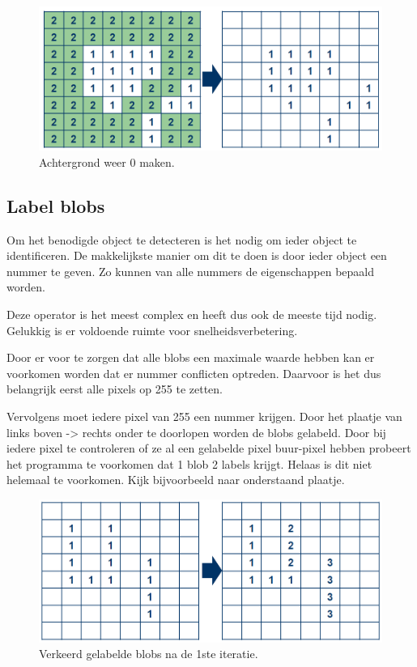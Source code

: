 \begin{figure}
    \begin{center}
        \includegraphics[scale=0.5]{figures/fill_holes_step4.png}
    \end{center}
    \caption{Achtergrond weer 0 maken.}
    \label{fig:fhstep4}
\end{figure}

\subsection{Label blobs}
\label{sec:labelblobs}
Om het benodigde object te detecteren is het nodig om ieder object te
identificeren. De makkelijkste manier om dit te doen is door ieder object een
nummer te geven. Zo kunnen van alle nummers de eigenschappen bepaald worden.

Deze operator is het meest complex en heeft dus ook de meeste tijd nodig.
Gelukkig is er voldoende ruimte voor snelheidsverbetering.

Door er voor te zorgen dat alle blobs een maximale waarde hebben kan er voorkomen
worden dat er nummer conflicten optreden. Daarvoor is het dus belangrijk eerst
alle pixels op 255 te zetten.

Vervolgens moet iedere pixel van 255 een nummer krijgen. Door het plaatje van
links boven -> rechts onder te doorlopen worden de blobs gelabeld. Door bij
iedere pixel te controleren of ze al een gelabelde pixel buur-pixel hebben
probeert het programma te voorkomen dat 1 blob 2 labels krijgt. Helaas is dit
niet helemaal te voorkomen. Kijk bijvoorbeeld naar onderstaand plaatje.

\begin{figure}
    \begin{center}
        \includegraphics[scale=0.4]{figures/label_blobs_step1.png}
    \end{center}
    \caption{Verkeerd gelabelde blobs na de 1ste iteratie.}
    \label{fig:lbstep1}
\end{figure}

